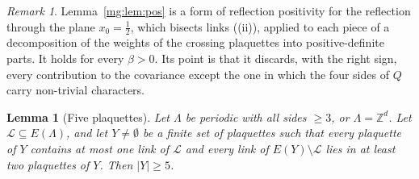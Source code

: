 \documentclass[11pt,a4paper]{article}
\newtheorem{lemma}[theorem]{Lemma}
\theoremstyle{definition}
\theoremstyle{remark}
\newtheorem{remark}[theorem]{Remark}
\newcommand{\Z}{\mathbb{Z}}
\newcommand{\Fname}[2]{\cite[#1~`#2']{F}}
\begin{document}
\begin{remark}
Lemma~\ref{mg:lem:pos} is a form of reflection positivity for the reflection through the plane $x_0=\frac12$, which bisects links
(\Fname{Remark}{Other reflections}(ii)), applied to each piece of a decomposition of the weights of the crossing plaquettes into positive-definite
parts. It holds for every $\beta>0$. Its point is that it discards, with the right sign, every contribution to the covariance except the one in
which the four sides of $Q$ carry non-trivial characters.
\end{remark}

\begin{lemma}[Five plaquettes]\label{mg:lem:five}
Let $\Lambda$ be periodic with all sides $\ge3$, or $\Lambda=\Z^d$. Let $\mathcal L\subseteq E(\Lambda)$, and let $Y\neq\emptyset$ be a finite set of
plaquettes such that every plaquette of $Y$ contains at most one link of $\mathcal L$ and every link of $E(Y)\setminus\mathcal L$ lies in at least two
plaquettes of $Y$. Then $|Y|\ge5$.
\end{lemma}
\end{document}
